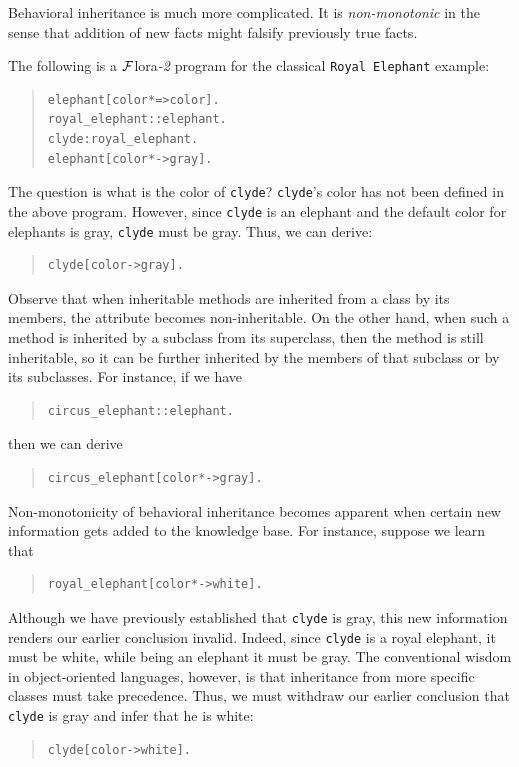 \documentclass[11pt]{article}
\newcommand{\FLORA}{{\mbox{\sc ${\cal F}${lora}\rm\emph{-2}}}\xspace}
\begin{document}
Behavioral inheritance is much more
complicated. It is \emph{non-monotonic} in the sense that
addition of new facts might falsify previously true facts.



The following is a \FLORA program for the classical {\tt Royal Elephant}
example:
\begin{quote}
\begin{verbatim}
elephant[color*=>color].
royal_elephant::elephant.
clyde:royal_elephant.
elephant[color*->gray].
\end{verbatim}
\end{quote}
The question is what is the color of {\tt clyde}?
{\tt clyde}'s color has not been defined in the above program. However, since
{\tt clyde} is an elephant and the default color for elephants is gray,
{\tt clyde}
must be gray. Thus, we can derive:
\begin{quote}
\begin{verbatim}
clyde[color->gray].  
\end{verbatim}
\end{quote}
Observe that when inheritable methods are inherited from a class by its
members, the attribute becomes non-inheritable. On the other hand, when
such a method is inherited by a subclass from its superclass, then the
method is still inheritable, so it can be further inherited by the members
of that subclass or by its subclasses. For instance, if we have
\begin{quote}
\begin{verbatim}
circus_elephant::elephant.
\end{verbatim}
\end{quote}
then we can derive 
\begin{quote}
\begin{verbatim}
circus_elephant[color*->gray].  
\end{verbatim}
\end{quote}

Non-monotonicity of behavioral inheritance becomes apparent when certain new
information gets added to the knowledge base. For instance, suppose we
learn that
\begin{quote}
\begin{verbatim}
royal_elephant[color*->white].  
\end{verbatim}
\end{quote}
Although we have previously established that {\tt clyde} is gray, this
new information renders our earlier conclusion invalid. Indeed, since
{\tt clyde} is a royal elephant, it must be white, while being an
elephant it must be gray.  The conventional wisdom in object-oriented
languages, however, is that inheritance from more specific classes
must take precedence. Thus, we must withdraw our earlier conclusion
that {\tt clyde} is gray and infer that he is white:
\begin{quote}
\begin{verbatim}
clyde[color->white].    
\end{verbatim}
\end{quote}
\end{document}
